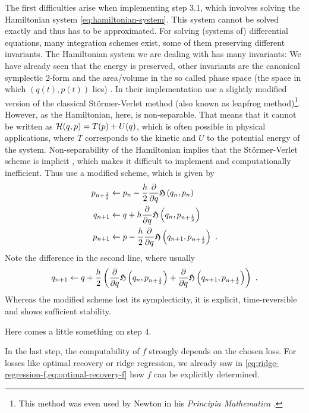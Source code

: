 The first difficulties arise when implementing step 3.1, which involves solving the Hamiltonian system \ref{eq:hamiltonian-system}.
This system cannot be solved exactly and thus has to be approximated.
For solving (systems of) differential equations, many integration schemes exist, some of them preserving different invariants.
The Hamiltonian system we are dealing with has many invariants:
We have already seen that the energy is preserved, other invariants are the canonical symplectic 2-form \cite{marsden10} and the area/volume in the so called phase space (the space in which $(q(t), p(t))$ lies) \cite{hairer06}.
In their implementation \citet{owhadi20} use a slightly modified version of the classical Störmer-Verlet method (also known as leapfrog method)\footnote{This method was even used by Newton in his \emph{Principia Mathematica} \cite{hairer03}.}.
However, as the Hamiltonian, here, is non-separable.
That means that it cannot be written as $\mathcal{H}(q, p) = T(p) + U(q)$, which is often possible in physical applications, where $T$ corresponds to the kinetic and $U$ to the potential energy of the system.
Non-separability of the Hamiltonian implies that the Störmer-Verlet scheme is implicit \cite{hairer06}, which makes it difficult to implement and computationally inefficient.
Thus \citet{owhadi20} use a modified scheme, which is given by
\begin{align}
	p_{n+\frac{1}{2}} &\gets p_n - \frac{h}{2} \frac{\partial}{\partial q}\mathfrak{H}\left(q_n, p_n\right) \\
	q_{n+1} &\gets q + h \frac{\partial}{\partial q}\mathfrak{H}\left(q_n, p_{n+\frac{1}{2}}\right)\\
	p_{n+1} &\gets p - \frac{h}{2} \frac{\partial}{\partial q}\mathfrak{H}\left(q_{n+1}, p_{n+\frac{1}{2}}\right) \ .
\end{align}
Note the difference in the second line, where usually 
\begin{equation}
q_{n+1} \gets q + \frac{h}{2} \left(\frac{\partial}{\partial q}\mathfrak{H}\left(q_n, p_{n+\frac{1}{2}}\right) + \frac{\partial}{\partial q}\mathfrak{H}\left(q_{n+1}, p_{n+\frac{1}{2}}\right)\right) \ .
\end{equation}
Whereas the modified scheme lost its symplecticity, it is explicit, time-reversible and shows sufficient stability.

Here comes a little something on step 4.

In the last step, the computability of $f$ strongly depends on the chosen loss.
For losses like optimal recovery or ridge regression, we already saw in \cref{eq:ridge-regression-f,eq:optimal-recovery-f} how $f$ can be explicitly determined.



